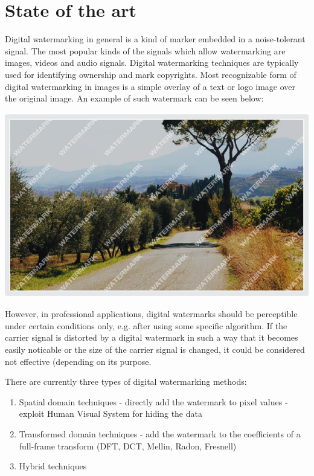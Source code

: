 \documentclass[a4paper, 12pt]{article}
\begin{document}
\section{State of the art}

Digital watermarking in general is a kind of marker embedded in a noise-tolerant signal. The most popular kinds of the signals which allow watermarking are images, videos and audio signals. Digital watermarking techniques are typically used for identifying ownership and mark copyrights. Most recognizable form of digital watermarking in images is a simple overlay of a text or logo image over the original image. An example of such watermark can be seen below:

\begin{center}
    \includegraphics[width=1\textwidth]{ex.png} \par
\end{center}

However, in professional applications, digital watermarks should be perceptible under certain conditions only, e.g. after using some specific algorithm. If the carrier signal is distorted by a digital watermark in such a way that it becomes easily noticable or the size of the carrier signal is changed, it could be considered not effective (depending on its purpose. \par

\newpage
There are currently three types of digital watermarking methods:

\begin{enumerate}
	\item Spatial domain techniques - directly add the watermark to pixel values - exploit Human Visual System for hiding the data
	\item Transformed domain techniques - add the watermark to the coefficients of a full-frame transform (DFT, DCT, Mellin, Radon, Fresnell)
	\item Hybrid techniques
\end{enumerate}
\end{document}
